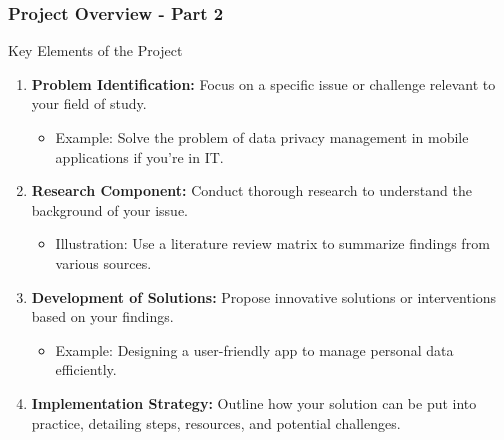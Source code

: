 \documentclass[aspectratio=169]{beamer}
\begin{document}
\begin{frame}[fragile]
  \frametitle{Project Overview - Part 2}
  \begin{block}{Key Elements of the Project}
    \begin{enumerate}
      \item \textbf{Problem Identification:}
        Focus on a specific issue or challenge relevant to your field of study.
        \begin{itemize}
          \item Example: Solve the problem of data privacy management in mobile applications if you're in IT.
        \end{itemize}
      
      \item \textbf{Research Component:}
        Conduct thorough research to understand the background of your issue.
        \begin{itemize}
          \item Illustration: Use a literature review matrix to summarize findings from various sources.
        \end{itemize}
      
      \item \textbf{Development of Solutions:}
        Propose innovative solutions or interventions based on your findings.
        \begin{itemize}
          \item Example: Designing a user-friendly app to manage personal data efficiently.
        \end{itemize}
      
      \item \textbf{Implementation Strategy:}
        Outline how your solution can be put into practice, detailing steps, resources, and potential challenges.
    \end{enumerate}
  \end{block}
\end{frame}
\end{document}
